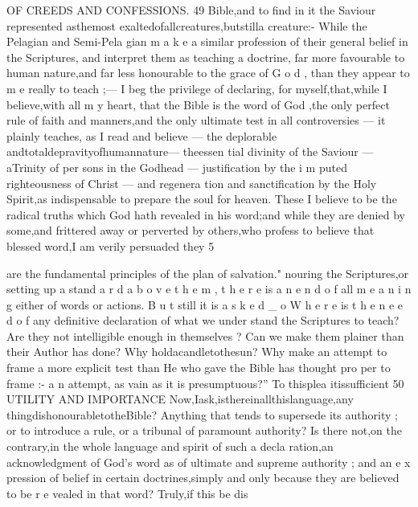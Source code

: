 \documentclass[
]{book}
\begin{document}
OF CREEDS AND CONFESSIONS. 49
Bible,and to find in it the Saviour represented asthemost exaltedofallcreatures,butstilla creature:- While the Pelagian and Semi-Pela gian m a k e a similar profession of their general belief in the Scriptures, and interpret them as teaching a doctrine, far more favourable to human nature,and far less honourable to the grace of G o d , than they appear to m e really to teach ;--- I beg the privilege of declaring, for
myself,that,while I believe,with all m y heart, that the Bible is the word of God ,the only
perfect rule of faith and manners,and the only ultimate test in all controversies --- it plainly
teaches, as I read and believe --- the deplorable andtotaldepravityofhumannature--- theessen tial divinity of the Saviour --- aTrinity of per sons in the Godhead --- justification by the i m puted righteousness of Christ --- and regenera tion and sanctification by the Holy Spirit,as indispensable to prepare the soul for heaven. These I believe to be the radical truths which God hath revealed in his word;and while they are denied by some,and frittered away
or perverted by others,who profess to believe that blessed word,I am verily persuaded they
5

are the fundamental principles of the plan of salvation."
nouring the Scriptures,or setting up a stand a r d a b o v e t h e m , t h e r e is a n e n d o f all m e a n i n g either of words or actions.
B u t still it is a s k e d \_ o W h e r e is t h e n e e d o f
any definitive declaration of what we under stand the Scriptures to teach? Are they not intelligible enough in themselves ? Can we make them plainer than their Author has done? Why holdacandletothesun? Why make an attempt to frame a more explicit test than He who gave the Bible has thought pro per to frame :- a n attempt, as vain as it is presumptuous?'' To thisplea itissufficient
50 UTILITY AND IMPORTANCE
Now,Iask,isthereinallthislanguage,any
thingdishonourabletotheBible? Anything that tends to supersede its authority ; or to
introduce a rule, or a tribunal of paramount authority? Is there not,on the contrary,in
the whole language and spirit of such a decla ration,an acknowledgment of God's word as of ultimate and supreme authority ; and an e x pression of belief in certain doctrines,simply and only because they are believed to be r e vealed in that word? Truly,if this be dis
\end{document}
